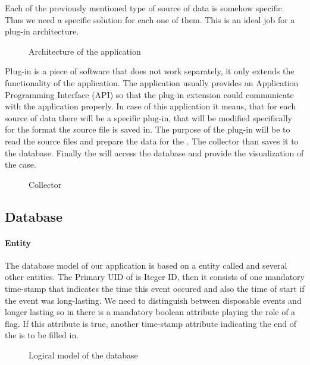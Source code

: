 Each of the previously mentioned type of source of data is somehow specific. Thus we need a specific solution for each one of them. This is an ideal job for a plug-in architecture. 

\begin{figure}[!h]
    \centering 
    \epsfysize=60mm 
    \caption{Architecture of the application}\label{Architecture}
\end{figure}

Plug-in is a piece of software that does not work separately, it only extends the functionality of the application. The application usually provides an Application Programming Interface (API) so that the plug-in extension could communicate with the application properly. In case of this application it means, that for each source of data there will be a specific plug-in, that will be modified specifically for the format the source file is saved in. The purpose of the plug-in will be to read the source files and prepare the data for the . The collector than saves it to the database. Finally the  will access the database and provide the visualization of the case.

\begin{figure}[!h]
    \centering 
    \epsfysize=60mm 
    \caption{Collector}\label{Collector}
\end{figure}

\subsection{Database}
\paragraph{Entity }
The database model of our application is based on a entity called  and several other entities. The Primary UID of  is Iteger ID, then it consists of one mandatory time-stamp that indicates the time this event occured and also the time of start if the event was long-lasting. We need to distinguish between disposable events and longer lasting so in there is a mandatory boolean attribute  playing the role of a flag. If this attribute is true, another time-stamp attribute indicating the end of the  is to be filled in. 

\begin{figure}[!h]
    \centering 
    \epsfysize=180mm 
    \caption{Logical model of the database}\label{Logical}
\end{figure}

